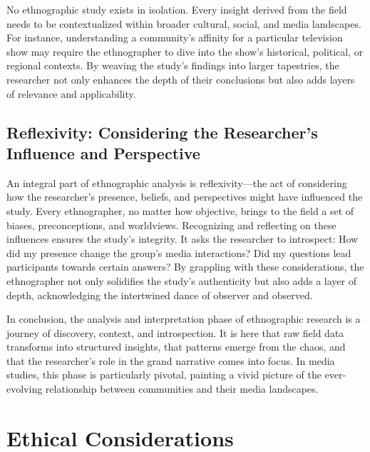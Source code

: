 \documentclass[
  b5paper]{book}
\begin{document}
No ethnographic study exists in isolation. Every insight derived from the field needs to be contextualized within broader cultural, social, and media landscapes. For instance, understanding a community's affinity for a particular television show may require the ethnographer to dive into the show's historical, political, or regional contexts. By weaving the study's findings into larger tapestries, the researcher not only enhances the depth of their conclusions but also adds layers of relevance and applicability.

\hypertarget{reflexivity-considering-the-researchers-influence-and-perspective}{%
\subsection*{Reflexivity: Considering the Researcher's Influence and Perspective}\label{reflexivity-considering-the-researchers-influence-and-perspective}}

An integral part of ethnographic analysis is reflexivity---the act of considering how the researcher's presence, beliefs, and perspectives might have influenced the study. Every ethnographer, no matter how objective, brings to the field a set of biases, preconceptions, and worldviews. Recognizing and reflecting on these influences ensures the study's integrity. It asks the researcher to introspect: How did my presence change the group's media interactions? Did my questions lead participants towards certain answers? By grappling with these considerations, the ethnographer not only solidifies the study's authenticity but also adds a layer of depth, acknowledging the intertwined dance of observer and observed.

In conclusion, the analysis and interpretation phase of ethnographic research is a journey of discovery, context, and introspection. It is here that raw field data transforms into structured insights, that patterns emerge from the chaos, and that the researcher's role in the grand narrative comes into focus. In media studies, this phase is particularly pivotal, painting a vivid picture of the ever-evolving relationship between communities and their media landscapes.

\hypertarget{ethical-considerations-2}{%
\section{Ethical Considerations}\label{ethical-considerations-2}}
\end{document}
